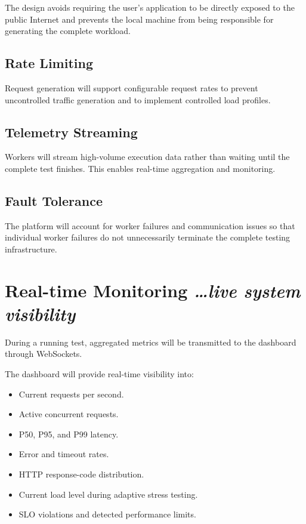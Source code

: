 \documentclass[11pt,a4paper]{article}
\newcommand{\BvrHint}[1]{%
  {\normalfont\normalsize\itshape\hfill #1}}
\begin{document}
The design avoids requiring the user's application to be directly
exposed to the public Internet and prevents the local machine from
being responsible for generating the complete workload.

\subsection{Rate Limiting}

Request generation will support configurable request rates to prevent
uncontrolled traffic generation and to implement controlled load
profiles.

\subsection{Telemetry Streaming}

Workers will stream high-volume execution data rather than waiting
until the complete test finishes. This enables real-time aggregation
and monitoring.

\subsection{Fault Tolerance}

The platform will account for worker failures and communication
issues so that individual worker failures do not unnecessarily
terminate the complete testing infrastructure.

\section{Real-time Monitoring%
  \BvrHint{\ldots live system visibility}}

During a running test, aggregated metrics will be transmitted to the
dashboard through WebSockets.

The dashboard will provide real-time visibility into:

\begin{itemize}[leftmargin=0.7cm]

    \item Current requests per second.

    \item Active concurrent requests.

    \item P50, P95, and P99 latency.

    \item Error and timeout rates.

    \item HTTP response-code distribution.

    \item Current load level during adaptive stress testing.

    \item SLO violations and detected performance limits.

\end{itemize}
\end{document}
